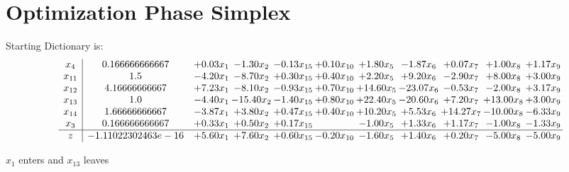 \documentclass[9pt]{article}
\begin{document}
\section{Optimization Phase Simplex}
Starting Dictionary is:
\[\begin{array}{c| c c@{\hskip 2pt} c@{\hskip 2pt} c@{\hskip 2pt} c@{\hskip 2pt} c@{\hskip 2pt} c@{\hskip 2pt} c@{\hskip 2pt} c@{\hskip 2pt} c@{\hskip 2pt} }
 x_{4}   &  0.166666666667 & +  0.03 x_{1} & -1.30 x_{2} & -0.13 x_{15} & +  0.10 x_{10} & +  1.80 x_{5} & -1.87 x_{6} & +  0.07 x_{7} & +  1.00 x_{8} & +  1.17 x_{9}\\
 x_{11}   &  1.5 & -4.20 x_{1} & -8.70 x_{2} & +  0.30 x_{15} & +  0.40 x_{10} & +  2.20 x_{5} & +  9.20 x_{6} & -2.90 x_{7} & +  8.00 x_{8} & +  3.00 x_{9}\\
 x_{12}   &  4.16666666667 & +  7.23 x_{1} & -8.10 x_{2} & -0.93 x_{15} & +  0.70 x_{10} & + 14.60 x_{5} & -23.07 x_{6} & -0.53 x_{7} & -2.00 x_{8} & +  3.17 x_{9}\\
 x_{13}   &  1.0 & -4.40 x_{1} & -15.40 x_{2} & -1.40 x_{15} & +  0.80 x_{10} & + 22.40 x_{5} & -20.60 x_{6} & +  7.20 x_{7} & + 13.00 x_{8} & +  3.00 x_{9}\\
 x_{14}   &  1.66666666667 & -3.87 x_{1} & +  3.80 x_{2} & +  0.47 x_{15} & +  0.40 x_{10} & + 10.20 x_{5} & +  5.53 x_{6} & + 14.27 x_{7} & -10.00 x_{8} & -6.33 x_{9}\\
 x_{3}   &  0.166666666667 & +  0.33 x_{1} & +  0.50 x_{2} & +  0.17 x_{15} &   & -1.00 x_{5} & +  1.33 x_{6} & +  1.17 x_{7} & -1.00 x_{8} & -1.33 x_{9}\\
\hline
z    &  -1.11022302463e-16 & +  5.60 x_{1} & +  7.60 x_{2} & +  0.60 x_{15} & -0.20 x_{10} & -1.60 x_{5} & +  1.40 x_{6} & +  0.20 x_{7} & -5.00 x_{8} & -5.00 x_{9}\\
\end{array}\]


 $ x_{1} $ enters and $ x_{13} $ leaves 
\end{document}
